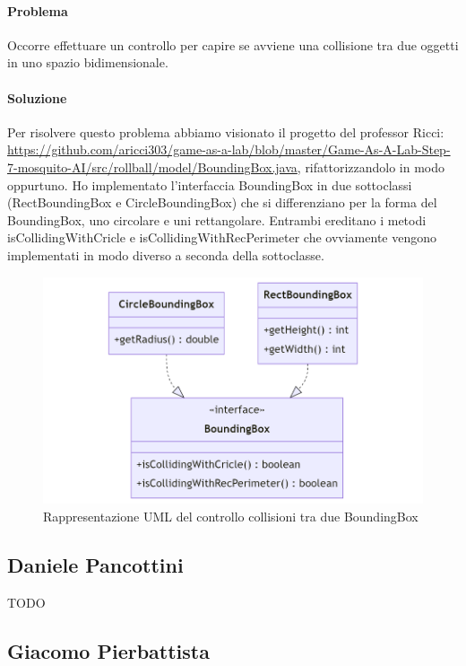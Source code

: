 \documentclass[a4paper,12pt]{report}
\begin{document}
\paragraph{Problema} Occorre effettuare un controllo per capire se avviene una collisione tra due oggetti in uno spazio bidimensionale.
\paragraph{Soluzione} Per risolvere questo problema abbiamo visionato il progetto del professor Ricci: \url{https://github.com/aricci303/game-as-a-lab/blob/master/Game-As-A-Lab-Step-7-mosquito-AI/src/rollball/model/BoundingBox.java}, rifattorizzandolo in modo oppurtuno. Ho implementato l'interfaccia BoundingBox in due sottoclassi (RectBoundingBox e CircleBoundingBox) che si differenziano per la forma del BoundingBox, uno circolare e uni rettangolare. Entrambi ereditano i metodi isCollidingWithCricle e isCollidingWithRecPerimeter che ovviamente vengono implementati in modo diverso a seconda della sottoclasse.
\begin{figure}[H]
    \centering{}
    \includegraphics[scale=0.4]{diagram/BoundingBox.png}
    \caption{Rappresentazione UML del controllo collisioni tra due BoundingBox}
    \label{img:BoundingBox}
\end{figure}


\subsection*{Daniele Pancottini}
{TODO}


\subsection*{Giacomo Pierbattista}
\end{document}

